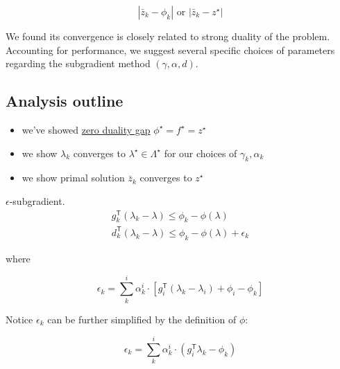 \[
  |\bar z_k - \phi_k| \textrm { or } |\bar z_k - z^\star|
\]

We found its convergence is closely related to strong duality of the problem. Accounting for performance,
we suggest several specific choices of parameters regarding the subgradient method \((\gamma, \alpha, d)\).


\hypertarget{analysis-outline}{%
  \subsection{Analysis outline}\label{analysis-outline}}

\begin{itemize}
  \tightlist
  \item
        we've showed \hyperlink{conditions for strong-duality}{zero duality gap}
        \(\phi^\star = f^\star= z^\star\)
  \item
        we show \(\lambda_k\) converges to \(\lambda^\star \in \Lambda^\star\)
        for our choices of \(\gamma_k, \alpha_k\)
  \item
        we show primal solution \(\bar z_k\) converges to \(z^\star\)
\end{itemize}

\begin{lemma}\(\epsilon\)-subgradient.
  \begin{equation}\label{eq:subgrad}
    \begin{aligned}
      g_{k}^\mathsf{T}(\lambda_{k}  -\lambda) \le \phi_{k} - \phi(\lambda) \\
      d_{k}^\mathsf{T}(\lambda_{k}  -\lambda) \le \phi_{k} - \phi(\lambda) + \epsilon_k
    \end{aligned}
  \end{equation}
\end{lemma}

where

\begin{equation}\label{eq:def_eps}
  \epsilon_k = \sum^i_k \alpha^i_k \cdot \left [g_i^\mathsf{T}(\lambda_k - \lambda_i) + \phi_i - \phi_k \right ]
\end{equation}

Notice \(\epsilon_k\) can be further simplified by the definition of
\(\phi\):

\begin{equation}\label{eq:def_eps_simple}
  \epsilon_k = \sum^i_k \alpha^i_k \cdot \left ( g_i^\mathsf{T}\lambda_k  - \phi_k \right )
\end{equation}

